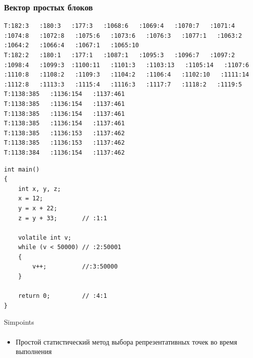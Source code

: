 \documentclass{beamer}              %
\begin{document}
\begin{frame}[fragile]
  \frametitle{Вектор простых блоков}
  
  \begin{lstlisting}[frame=single, basicstyle=\tiny]
  T:182:3   :180:3   :177:3   :1068:6   :1069:4   :1070:7   :1071:4   :1074:8   :1072:8   :1075:6   :1073:6   :1076:3   :1077:1   :1063:2   :1064:2   :1066:4   :1067:1   :1065:10      
T:182:2   :180:1   :177:1   :1087:1   :1095:3   :1096:7   :1097:2   :1098:4   :1099:3  :1100:11   :1101:3   :1103:13   :1105:14   :1107:6   :1110:8   :1108:2   :1109:3   :1104:2   :1106:4   :1102:10   :1111:14   :1112:8   :1113:3   :1115:4   :1116:3   :1117:7   :1118:2   :1119:5   
T:1138:385   :1136:154   :1137:461   
T:1138:385   :1136:154   :1137:461   
T:1138:385   :1136:154   :1137:461   
T:1138:385   :1136:154   :1137:461   
T:1138:385   :1136:153   :1137:462   
T:1138:385   :1136:153   :1137:462   
T:1138:384   :1136:154   :1137:462   
\end{lstlisting}

\begin{lstlisting}[frame=single, basicstyle=\tiny]
  int main()
{
	int x, y, z;
	x = 12;
	y = x + 22; 	
	z = y + 33;       // :1:1
                     
	volatile int v;
	while (v < 50000) // :2:50001 
	{
		v++;          //:3:50000 
	}

	return 0;         // :4:1
}

\end{lstlisting}
  
  
\end{frame}


\begin{frame}{Simpoints}
  \framesubtitle{}
  
  \begin{itemize}
      \item Простой статистический метод выбора репрезентативных точек во время выполнения \footnotemark
      
  \end{itemize}
  
  
\end{frame}
\end{document}
